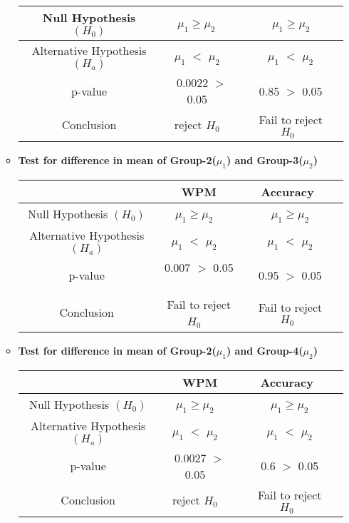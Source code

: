 \documentclass[12pt,a4paper]{report}
\begin{document}
\begin{enumerate}[label=\textbf{\arabic*})]
\begin{itemize}
\begin{center}
\begin{tabular}{ |c|c|c|c|}
      \hline
      Null Hypothesis $(H_0)$ & $\mu_1  \geq \mu_2$ \ & \ $\mu_1  \geq \mu_2$ \\ 
      \hline
      Alternative Hypothesis $(H_a)$ & $\mu_1$ $<$ $\mu_2$ \ & \ $\mu_1$ $<$ $\mu_2$ \\
      \hline
      p-value & 0.0022 $>$ 0.05 \ & \ 0.85 $>$ 0.05 \\
      \hline
      Conclusion & reject $H_0$ \ & \ Fail to reject $H_0$ \\
      \hline
    \end{tabular}
    \end{center}
    \vspace{2mm}
        \item \textbf{Test for difference in mean of Group-2($\mu_1$) and Group-3($\mu_2$)}
         \begin{center}
    \begin{tabular}{ |c|c|c|c|}
      \hline
       & WPM & Accuracy \\
      \hline
      Null Hypothesis $(H_0)$ & $\mu_1  \geq \mu_2$ \ & \ $\mu_1  \geq \mu_2$ \\ 
      \hline
      Alternative Hypothesis $(H_a)$ & $\mu_1$ $<$ $\mu_2$ \ & \ $\mu_1$ $<$ $\mu_2$ \\
      \hline
      p-value & 0.007 $>$ 0.05 \ & \ 0.95 $>$ 0.05 \\
      \hline
      Conclusion & Fail to reject $H_0$ \ & \ Fail to reject $H_0$ \\
      \hline
    \end{tabular}
    \end{center}
    \vspace{2mm}
        \item \textbf{Test for difference in mean of Group-2($\mu_1$) and Group-4($\mu_2$)}
         \begin{center}
    \begin{tabular}{ |c|c|c|c|}
      \hline
       & WPM & Accuracy \\
      \hline
      Null Hypothesis $(H_0)$ & $\mu_1  \geq \mu_2$ \ & \ $\mu_1  \geq \mu_2$ \\ 
      \hline
      Alternative Hypothesis $(H_a)$ & $\mu_1$ $<$ $\mu_2$ \ & \ $\mu_1$ $<$ $\mu_2$ \\
      \hline
      p-value & 0.0027 $>$ 0.05 \ & \ 0.6 $>$ 0.05 \\
      \hline
      Conclusion & reject $H_0$ \ & \ Fail to reject $H_0$ \\
      \hline
    \end{tabular}

\end{center}
\end{itemize}
\end{enumerate}
\end{document}
